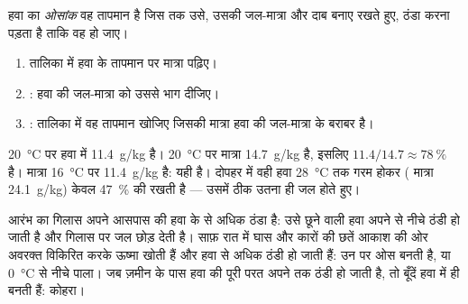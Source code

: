 \begin{definition}[ओसांक]\label{def:g10:why-clouds-form:dew-point}
हवा का \emph{ओसांक} वह तापमान है जिस तक उसे, उसकी जल-मात्रा और दाब
बनाए रखते हुए, ठंडा करना पड़ता है ताकि वह
 हो जाए।
\end{definition}

\begin{method}[तालिका से सापेक्ष आर्द्रता और ओसांक]\label{met:g10:why-clouds-form:table}
\begin{enumerate}
  \item तालिका में हवा के तापमान पर  मात्रा पढ़िए।
  \item {}: हवा की जल-मात्रा को उससे भाग दीजिए।
  \item {}: तालिका में वह तापमान खोजिए जिसकी 
        मात्रा हवा की जल-मात्रा के बराबर है।
\end{enumerate}
\end{method}

\begin{example}[गर्मियों की एक सुबह]\label{ex:g10:why-clouds-form:morning}
\qty{20}{\degreeCelsius} पर हवा में \qty{11.4}{g/kg} है।
\qty{20}{\degreeCelsius} पर  मात्रा \qty{14.7}{g/kg} है, इसलिए
 $11.4/14.7 \approx \qty{78}{\percent}$ है। 
मात्रा \qty{16}{\degreeCelsius} पर \qty{11.4}{g/kg} है: यही 
है। दोपहर में वही हवा \qty{28}{\degreeCelsius} तक गरम होकर
( मात्रा \qty{24.1}{g/kg}) केवल
\qty{47}{\percent} की  रखती है --- उसमें ठीक उतना ही जल होते हुए।
\end{example}

आरंभ का गिलास अपने आसपास की हवा के  से अधिक ठंडा है: उसे छूने वाली हवा अपने
 से नीचे ठंडी हो जाती है और गिलास पर जल छोड़ देती है। साफ़ रात में घास और कारों की
छतें आकाश की ओर अवरक्त विकिरित करके ऊष्मा खोती हैं और हवा से अधिक ठंडी हो जाती हैं:
उन पर ओस बनती है, या \qty{0}{\degreeCelsius} से नीचे पाला। जब ज़मीन के पास हवा की पूरी
परत अपने  तक ठंडी हो जाती है, तो बूँदें हवा में ही बनती हैं: कोहरा।

